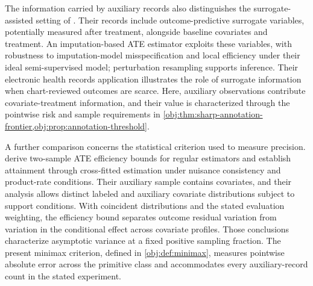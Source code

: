 \documentclass[11pt]{article}
\begin{document}
The information carried by auxiliary records also distinguishes the surrogate-assisted setting of \citet[Sections 2.1, 2.5--2.6, and 4]{ChengAnanthakrishnanCai2021}. Their records include outcome-predictive surrogate variables, potentially measured after treatment, alongside baseline covariates and treatment. An imputation-based ATE estimator exploits these variables, with robustness to imputation-model misspecification and local efficiency under their ideal semi-supervised model; perturbation resampling supports inference. Their electronic health records application illustrates the role of surrogate information when chart-reviewed outcomes are scarce. Here, auxiliary observations contribute covariate-treatment information, and their value is characterized through the pointwise risk and sample requirements in \cref{obj:thm:sharp-annotation-frontier,obj:prop:annotation-threshold}.

A further comparison concerns the statistical criterion used to measure precision. \citet[Theorems 4.2 and 4.4 and Corollary 4.5]{Kato2026} derive two-sample ATE efficiency bounds for regular estimators and establish attainment through cross-fitted estimation under nuisance consistency and product-rate conditions. Their auxiliary sample contains covariates, and their analysis allows distinct labeled and auxiliary covariate distributions subject to support conditions. With coincident distributions and the stated evaluation weighting, the efficiency bound separates outcome residual variation from variation in the conditional effect across covariate profiles. Those conclusions characterize asymptotic variance at a fixed positive sampling fraction. The present minimax criterion, defined in \cref{obj:def:minimax}, measures pointwise absolute error across the primitive class and accommodates every auxiliary-record count in the stated experiment.
\end{document}
